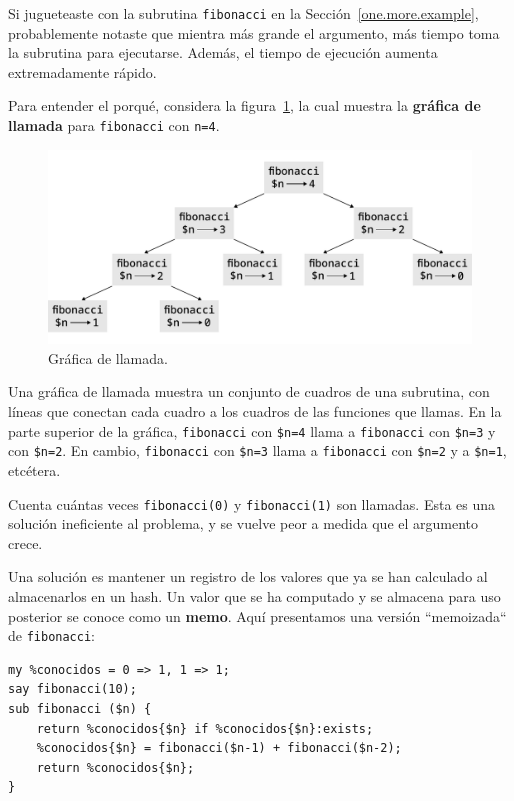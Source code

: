 Si jugueteaste con la subrutina {\tt fibonacci} en la 
Sección~\ref{one.more.example}, probablemente notaste que 
mientra más grande el argumento, más tiempo toma la subrutina
para ejecutarse. Además, el tiempo de ejecución aumenta extremadamente
rápido.

Para entender el porqué, considera la figura~\ref{fig.fibonacci},
la cual muestra la {\bf gráfica de llamada} para {\tt fibonacci} 
con {\tt n=4}.

\begin{figure}
\centerline
{\includegraphics[scale=0.7]{figs/fibonacci.pdf}}
\caption{Gráfica de llamada.}
\label{fig.fibonacci}
\end{figure}

Una gráfica de llamada muestra un conjunto de cuadros de 
una subrutina, con líneas que conectan cada cuadro a los 
cuadros de las funciones que llamas. En la parte superior
de la gráfica, {\tt fibonacci} con \verb|$n=4| llama a \verb|fibonacci|
con \verb|$n=3| y con \verb|$n=2|. En cambio, {\tt fibonacci} con
\verb|$n=3| llama a {\tt fibonacci} con \verb|$n=2| y a \verb|$n=1|,
etcétera.

Cuenta cuántas veces {\tt fibonacci(0)} y {\tt fibonacci(1)} 
son llamadas. Esta es una solución ineficiente al problema,
y se vuelve peor a medida que el argumento crece.

Una solución es mantener un registro de los valores que ya se han
calculado al almacenarlos en un hash. Un valor que se ha computado
y se almacena para uso posterior se conoce como un {\bf memo}. 
Aquí presentamos una versión ``memoizada`` de {\tt fibonacci}:

\begin{verbatim}
my %conocidos = 0 => 1, 1 => 1;
say fibonacci(10);
sub fibonacci ($n) {
    return %conocidos{$n} if %conocidos{$n}:exists;
    %conocidos{$n} = fibonacci($n-1) + fibonacci($n-2);
    return %conocidos{$n};
}
\end{verbatim}
%

